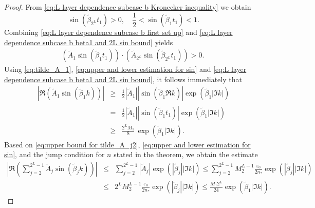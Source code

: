 \documentclass[11pt,reqno]{amsart}
\theoremstyle{definition}
\theoremstyle{remark}
\numberwithin{equation}{section}
\begin{document}
\begin{proof}
From \eqref{eq:L layer dependence subcase b Kronecker inequality} we obtain
\begin{equation}\label{eq:L layer dependence subcase b beta1 and 2L sin bound}
\sin\left(\tilde{\beta}_{2^L}t_1\right)>0,\quad
\frac{1}{2}<\sin\left(\tilde{\beta}_1t_1\right)<1. 
\end{equation}
Combining \eqref{eq:L layer dependence subcase b first set up} and \eqref{eq:L layer dependence subcase b beta1 and 2L sin bound} yields
\begin{equation}\label{eq:L layer dependence subcase b coefficient sin same sign}
    \begin{aligned}
     \left(\tilde{A}_1\sin\left(\tilde{\beta}_1t_1\right)\right)\cdot\left(\tilde{A}_{2^L}\sin\left(\tilde{\beta}_{2^L}t_1\right)\right)>0.~
    \end{aligned}
\end{equation}
Using \eqref{eq:tilde_A_1}, \eqref{eq:upper and lower estimation for sin} and \eqref{eq:L layer dependence subcase b beta1 and 2L sin bound}, it follows immediately that
\begin{eqnarray}\label{eq:L layer dependence subcase b sin beta1 estimation}
\left|\Re\left(\tilde{A}_1\sin\left(\tilde{\beta}_1k\right)\right)\right|& \geq & \frac{1}{2}\left|\tilde{A}_1\right| \left|\sin\left(\tilde{\beta}_1\Re k\right)\right|\exp{\left(\tilde{\beta}_1|\Im k|\right)}  \nonumber\\
     &=&\frac{1}{2}\left|\tilde{A}_1\right| \left|\sin\left(\tilde{\beta}_1t_1\right)\right|\exp{\left(\tilde{\beta}_1|\Im k|\right)} \nonumber\\
     &\geq &\frac{2^L M_1}{8}\, \exp{\left(\tilde{\beta}_1|\Im k|\right)}.~
\end{eqnarray}
Based on \eqref{eq:upper bound for tilde_A_j2}, \eqref{eq:upper and lower estimation for sin}, and the jump condition for $n$ stated in the theorem, we obtain the estimate
  \begin{eqnarray}\label{eq:L layer dependence estimation for part two of main term on the line}
     \left| \Re\left(\sum_{j=2}^{2^L-1}\tilde{A}_j\sin\left(\tilde{\beta}_j k\right)\right) \right|&\leq &\sum_{j=2}^{2^L-1}\left|\tilde{A}_j\right|\exp{\left(|\tilde{\beta}_j| |\Im k|\right)}\leq \sum_{j=2}^{2^L-1}M_2^{L-1}\frac{\varepsilon_0}{2n_{*}}\exp{\left(|\tilde{\beta}_j| |\Im k|\right)} \nonumber\\
     &\leq &2^L M_2^{L-1}\frac{\varepsilon_0}{2n_{*}}\exp{\left(|\tilde{\beta}_j| |\Im k|\right)}\leq \frac{M_1 2^L}{24}\exp{\left(\tilde{\beta}_1 |\Im k|\right)}.~
  \end{eqnarray}


\end{proof}
\end{document}
